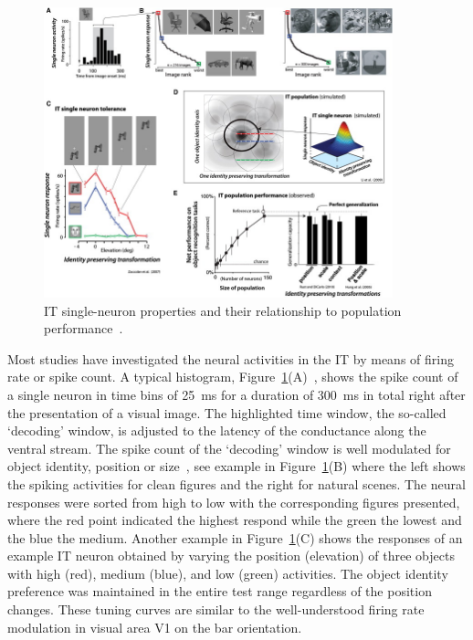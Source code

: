 \begin{figure}[b!]
	\centering
	\includegraphics[width=0.9\textwidth]{pics_report/IT.jpg}
	\caption{	
		IT single-neuron properties and their relationship to population performance~\cite{dicarlo2012does}.
	}
	\label{Fig:IT}
\end{figure}
Most studies have investigated the neural activities in the IT by means of firing rate or spike count.
A typical histogram, Figure~\ref{Fig:IT}(A)~\cite{zoccolan2007trade}, shows the spike count of a single neuron in time bins of 25~ms for a duration of 300~ms in total right after the presentation of a visual image.
The highlighted time window, the so-called `decoding' window, is adjusted to the latency of the conductance along the ventral stream. 
The spike count of the `decoding' window is well modulated for object identity, position or size~\cite{desimone1984stimulus,kaneko1996sequence}, see example in Figure~\ref{Fig:IT}(B) where the left shows the spiking activities for clean figures and the right for natural scenes.
The neural responses were sorted from high to low with the corresponding figures presented, where the red point indicated the highest respond while the green the lowest and the blue the medium.
Another example in Figure~\ref{Fig:IT}(C) shows the responses of an example IT neuron obtained by varying the position (elevation) of three objects with high (red), medium (blue), and low (green) activities.
The object identity preference was maintained in the entire test range regardless of the position changes.
These tuning curves are similar to the well-understood firing rate modulation in visual area V1 on the bar orientation.

